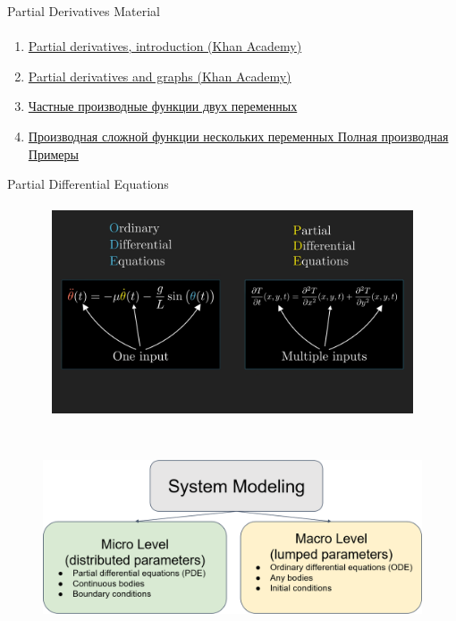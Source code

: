 \documentclass[aspectratio=169]{beamer}
\begin{document}
\begin{frame}[t]{Partial Derivatives Material}
    \framesubtitle{}
    \begin{enumerate}
        \item \href{https://www.youtube.com/watch?v=AXqhWeUEtQU}{Partial derivatives, introduction (Khan Academy) }
        \item \href{https://youtu.be/dfvnCHqzK54}{Partial derivatives and graphs (Khan Academy)}
        \item \href{https://youtu.be/2LkVV60OS08}{Частные производные функции двух переменных}
        \item \href{https://youtu.be/YwmGyGyDB_I}{Производная сложной функции нескольких переменных Полная производная Примеры}
    \end{enumerate}
\end{frame}

\begin{frame}[t]{Partial Differential Equations}
\framesubtitle{}
    \vspace{-0.6cm}
    \begin{figure}[H]
        \centering\includegraphics[height=6cm,width=1\textwidth,keepaspectratio]{pde.png}
        \label{fig:pde.png}
    \end{figure}
\end{frame}

\begin{frame}[t]{}
    \framesubtitle{}
    \begin{figure}[H]
        \centering\includegraphics[height=6cm,width=1\textwidth,keepaspectratio]{system_modeling.png}
        \label{fig:system_modeling.png}
    \end{figure}
\end{frame}
\end{document}
